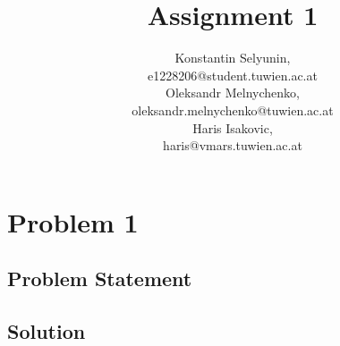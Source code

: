 \documentclass[12pt,a4paper,titlepage,oneside]{article}
\title{Assignment 1}
\author{Konstantin Selyunin, \matrnr 1228206   \\
         {\small e1228206@student.tuwien.ac.at} \\
        Oleksandr Melnychenko, \matrnr 1228477 \\
         {\small oleksandr.melnychenko@tuwien.ac.at}\\
        Haris Isakovic, \matrnr  0325697  \\
         {\small haris@vmars.tuwien.ac.at}\\
}
\begin{document}
\maketitle

\tableofcontents

\section{Problem 1}

\subsection{Problem Statement}


\subsection{Solution}
\end{document}
